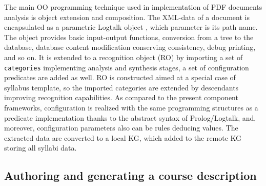 \documentclass[
]{aiitart}
\begin{document}
The main OO programming technique used in implementation of PDF documents analysis is object extension and composition.  The XML-data of a document is encapsulated as a parametric Logtalk object \cite{logtalk}, which parameter is its path name.  The object provides basic input-output functions, conversion from a tree to the database, database content modification conserving consistency, debug printing, and so on.  It is extended to a recognition object (RO) by importing a set of \verb|categories| implementing analysis and synthesis stages, a set of configuration predicates are added as well.  RO is constructed aimed at a special case of syllabus template, so the imported categories are extended by descendants improving recognition capabilities.  As compared to the present component frameworks, configuration is realized with the same programming structures as a predicate implementation thanks to the abstract syntax of Prolog/Logtalk, and, moreover, configuration parameters also can be rules deducing values.  The extracted data are converted to a local KG, which added to the remote KG storing all syllabi data.

\subsection{Authoring and generating a course description}
\end{document}
